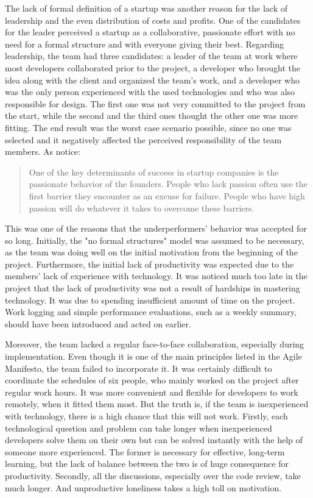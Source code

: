 \documentclass{article}
\begin{document}
The lack of formal definition of a startup \citep{paternoster2014software} was another reason for the lack of leadership and the even distribution of costs and profits. One of the candidates for the leader perceived a startup as a collaborative, passionate effort with no need for a formal structure and with everyone giving their best. 
Regarding leadership, the team had three candidates: a leader of the team at work where most developers collaborated prior to the project, a developer who brought the idea along with the client and organized the team's work, and a developer who was the only person experienced with the used technologies and who was also responsible for design. The first one was not very committed to the project from the start, while the second and the third ones thought the other one was more fitting. The end result was the worst case scenario possible, since no one was selected and it negatively affected the perceived responsibility of the team members.
As \cite{giardino2014early} notice:
\begin{quote}
  One of the key determinants of success in startup companies is the passionate behavior of the founders. People who lack passion often use the first barrier they encounter as an excuse for failure. People who have high passion will do whatever it takes to overcome these barriers.
\end{quote}

This was one of the reasons that the underperformers' behavior was accepted for so long. Initially, the "no formal structures" model was assumed to be necessary, as the team was doing well on the initial motivation from the beginning of the project. Furthermore, the initial lack of productivity was expected due to the members' lack of experience with technology. It was noticed much too late in the project that the lack of productivity was not a result of hardships in mastering technology. It was due to spending insufficient amount of time on the project. Work logging and simple performance evaluations, such as a weekly summary, should have been introduced and acted on earlier.

Moreover, the team lacked a regular face-to-face collaboration, especially during implementation. Even though it is one of the main principles listed in the Agile Manifesto, the team failed to incorporate it. It was certainly difficult to coordinate the schedules of six people, who mainly worked on the project after regular work hours. It was more convenient and flexible for developers to work remotely, when it fitted them most. But the truth is, if the team is inexperienced with technology, there is a high chance that this will not work. Firstly, each technological question and problem can take longer when inexperienced developers solve them on their own but can be solved instantly with the help of someone more experienced. The former is necessary for effective, long-term learning, but the lack of balance between the two is of huge consequence for productivity. Secondly, all the discussions, especially over the code review, take much longer. And unproductive loneliness takes a high toll on motivation.
\end{document}

